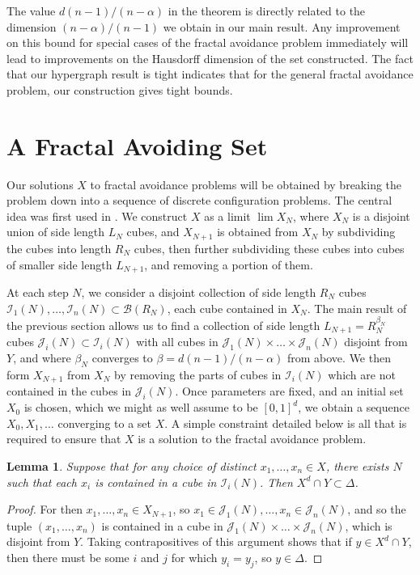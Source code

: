 \documentclass{article}
\theoremstyle{plain}
\newtheorem{lemma}{Lemma}
\theoremstyle{plain}
\begin{document}
\begin{multicols}{2}
The value $d(n-1)/(n-\alpha)$ in the theorem is directly related to the dimension $(n-\alpha)/(n-1)$ we obtain in our main result. Any improvement on this bound for special cases of the fractal avoidance problem immediately will lead to improvements on the Hausdorff dimension of the set constructed. The fact that our hypergraph result is tight indicates that for the general fractal avoidance problem, our construction gives tight bounds.


\section{A Fractal Avoiding Set}

Our solutions $X$ to fractal avoidance problems will be obtained by breaking the problem down into a sequence of discrete configuration problems. The central idea was first used in \cite{MalabikaRob}. We construct $X$ as a limit $\lim X_N$, where $X_N$ is a disjoint union of side length $L_N$ cubes, and $X_{N+1}$ is obtained from $X_N$ by subdividing the cubes into length $R_N$ cubes, then further subdividing these cubes into cubes of smaller side length $L_{N+1}$, and removing a portion of them.

At each step $N$, we consider a disjoint collection of side length $R_N$ cubes $\mathcal{I}_1(N), \dots, \mathcal{I}_n(N) \subset \mathcal{B}(R_N)$, each cube contained in $X_N$. The main result of the previous section allows us to find a collection of side length $L_{N+1} = R_N^{\beta_N}$ cubes $\mathcal{J}_i(N) \subset \mathcal{I}_i(N)$ with all cubes in $\mathcal{J}_1(N) \times \dots \times \mathcal{J}_n(N)$ disjoint from $Y$, and where $\beta_N$ converges to $\beta = d(n-1)/(n-\alpha)$ from above. We then form $X_{N+1}$ from $X_N$ by removing the parts of cubes in $\mathcal{I}_i(N)$ which are not contained in the cubes in $\mathcal{J}_i(N)$. Once parameters are fixed, and an initial set $X_0$ is chosen, which we might as well assume to be $[0,1]^d$, we obtain a sequence $X_0, X_1, \dots$ converging to a set $X$. A simple constraint detailed below is all that is required to ensure that $X$ is a solution to the fractal avoidance problem.

\begin{lemma}
	Suppose that for any choice of distinct $x_1, \dots, x_n \in X$, there exists $N$ such that each $x_i$ is contained in a cube in $\mathcal{I}_i(N)$. Then $X^d \cap Y \subset \Delta$.
\end{lemma}
\begin{proof}
	For then $x_1, \dots, x_n \in X_{N+1}$, so $x_1 \in \mathcal{J}_1(N), \dots, x_n \in \mathcal{J}_n(N)$, and so the tuple $(x_1, \dots, x_n)$ is contained in a cube in $\mathcal{J}_1(N) \times \dots \times \mathcal{J}_n(N)$, which is disjoint from $Y$. Taking contrapositives of this argument shows that if $y \in X^d \cap Y$, then there must be some $i$ and $j$ for which $y_i = y_j$, so $y \in \Delta$.
\end{proof}


\end{multicols}
\end{document}
